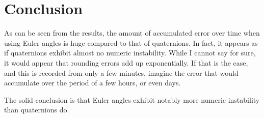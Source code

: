 \documentclass[a4paper]{article}
\begin{document}
\section{Conclusion}

As can be seen from the results, the amount of accumulated error over time when using Euler angles is huge compared to that of quaternions. In fact, it appears as if quaternions exhibit almost no numeric instability. While I cannot say for sure, it would appear that rounding errors add up exponentially. If that is the case, and this is recorded from only a few minutes, imagine the error that would accumulate over the period of a few hours, or even days.

The solid conclusion is that Euler angles exhibit notably more numeric instability than quaternions do.
\end{document}

